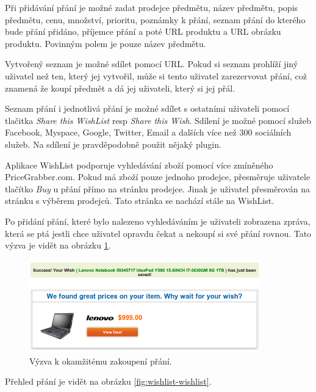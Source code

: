 Při přidávání přání je možné zadat prodejce předmětu, název předmětu, popis předmětu, cenu, množství, prioritu, poznámky k přání, seznam přání do kterého bude přání přidáno, příjemce přání a poté URL produktu a URL obrázku produktu. Povinným polem je pouze název předmětu.

Vytvořený seznam je možné sdílet pomocí URL. Pokud si seznam prohlíží jiný uživatel než ten, který jej vytvořil, může si tento uživatel zarezervovat přání, což znamená že koupí předmět a dá jej uživateli, který si jej přál.

Seznam přání i jednotlivá přání je možné sdílet s ostatními uživateli pomocí tlačitka \emph{Share this WishList} resp \emph{Share this Wish}. Sdílení je možné pomocí služeb Facebook, Myspace, Google, Twitter, Email a dalších více než 300 sociálních služeb. Na sdílení je pravděpodobně použit nějaký plugin.

Aplikace WishList podporuje vyhledávání zboží pomocí více zmíněného PriceGrabber.com. Pokud má zboží pouze jednoho prodejce, přesměruje uživatele tlačítko \emph{Buy} u přání přímo na stránku prodejce. Jinak je uživatel přesměrován na stránku s výběrem prodejců. Tato stránka se nachází stále na WishList.

Po přidání přání, které bylo nalezeno vyhledáváním je uživateli zobrazena zpráva, která se ptá jestli chce uživatel opravdu čekat a nekoupí si své přání rovnou. Tato výzva je vidět na obrázku \ref{fig:wishlist-buynow}.

\begin{figure}[htb]
\begin{center}
\includegraphics[width=100mm]{./pictures/wishlist-buynow.png}
\caption{Výzva k okamžitému zakoupení přání.}
\label{fig:wishlist-buynow}
\end{center}
\end{figure}

Přehled přání je vidět na obrázku \ref{fig:wishlist-wishlist}.

